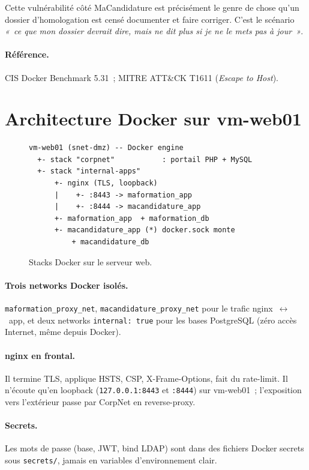 Cette vulnérabilité côté MaCandidature est précisément le genre
de chose qu'un dossier d'homologation est censé documenter et
faire corriger. C'est le scénario \emph{«~ce que mon
dossier devrait dire, mais ne dit plus si je ne le mets pas à
jour~»}.

\paragraph{Référence.} CIS Docker Benchmark 5.31~; MITRE
ATT\&CK T1611 (\emph{Escape to Host}).

\section{Architecture Docker sur vm-web01}

\begin{figure}[h]
\centering
\begin{small}
\begin{verbatim}
vm-web01 (snet-dmz) -- Docker engine
  +- stack "corpnet"           : portail PHP + MySQL
  +- stack "internal-apps"
      +- nginx (TLS, loopback)
      |    +- :8443 -> maformation_app
      |    +- :8444 -> macandidature_app
      +- maformation_app  + maformation_db
      +- macandidature_app (*) docker.sock monte
          + macandidature_db
\end{verbatim}
\end{small}
\caption{Stacks Docker sur le serveur web.}
\label{fig:docker-web01}
\end{figure}

\paragraph{Trois networks Docker isolés.}
\texttt{maformation\_proxy\_net}, \texttt{macandidature\_proxy\_net}
pour le trafic nginx~$\leftrightarrow$~app, et deux networks
\texttt{internal: true} pour les bases PostgreSQL (zéro accès
Internet, même depuis Docker).

\paragraph{nginx en frontal.}
Il termine TLS, applique HSTS, CSP, X-Frame-Options, fait du
rate-limit. Il n'écoute qu'en loopback (\texttt{127.0.0.1:8443}
et \texttt{:8444}) sur vm-web01~; l'exposition vers l'extérieur
passe par CorpNet en reverse-proxy.

\paragraph{Secrets.}
Les mots de passe (base, JWT, bind LDAP) sont dans des fichiers
Docker secrets sous \texttt{secrets/}, jamais en variables
d'environnement clair.

